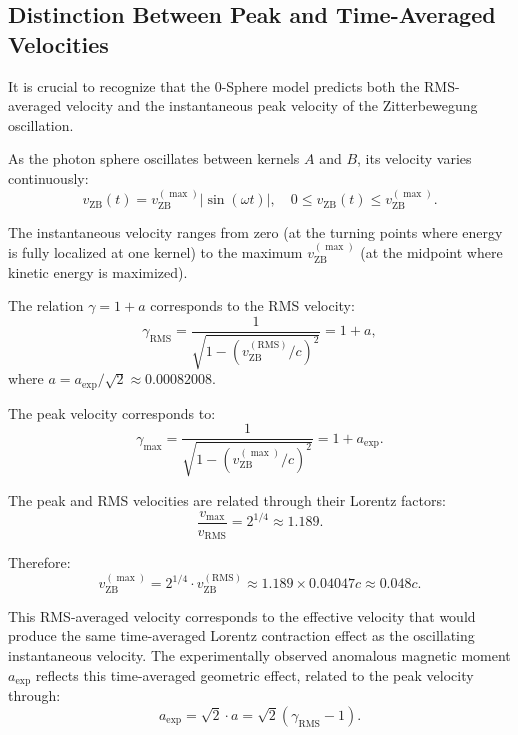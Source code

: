 \documentclass[12pt,letterpaper]{article}
\begin{document}
\subsection{Distinction Between Peak and Time-Averaged Velocities}

It is crucial to recognize that the 0-Sphere model predicts both the RMS-averaged velocity and the instantaneous peak velocity of the Zitterbewegung oscillation.

As the photon sphere oscillates between kernels $A$ and $B$, its velocity varies continuously:
\begin{equation}
v_{\mathrm{ZB}}(t) = v_{\mathrm{ZB}}^{(\max)} |\sin(\omega t)|, 
\quad 0 \le v_{\mathrm{ZB}}(t) \le v_{\mathrm{ZB}}^{(\max)}.
\end{equation}

The instantaneous velocity ranges from zero (at the turning points where energy is fully localized at one kernel) to the maximum $v_{\mathrm{ZB}}^{(\max)}$ (at the midpoint where kinetic energy is maximized).

The relation $\gamma = 1 + a$ corresponds to the RMS velocity:
\begin{equation}
\gamma_{\mathrm{RMS}} = \frac{1}{\sqrt{1 - (v_{\mathrm{ZB}}^{(\mathrm{RMS})}/c)^2}} = 1 + a,
\end{equation}
where $a = a_{\mathrm{exp}}/\sqrt{2} \approx 0.00082008$.

The peak velocity corresponds to:
\begin{equation}
\gamma_{\max} = \frac{1}{\sqrt{1 - (v_{\mathrm{ZB}}^{(\max)}/c)^2}} = 1 + a_{\mathrm{exp}}.
\end{equation}

The peak and RMS velocities are related through their Lorentz factors:
\begin{equation}
\frac{v_{\max}}{v_{\mathrm{RMS}}} = 2^{1/4} \approx 1.189.
\end{equation}

Therefore:
\begin{equation}
v_{\mathrm{ZB}}^{(\max)} = 2^{1/4} \cdot v_{\mathrm{ZB}}^{(\mathrm{RMS})} \approx 1.189 \times 0.04047c \approx 0.048c.
\end{equation}

This RMS-averaged velocity corresponds to the effective velocity that would produce the same time-averaged Lorentz contraction effect as the oscillating instantaneous velocity. The experimentally observed anomalous magnetic moment $a_{\mathrm{exp}}$ reflects this time-averaged geometric effect, related to the peak velocity through:
\begin{equation}
a_{\mathrm{exp}} = \sqrt{2} \cdot a = \sqrt{2}(\gamma_{\mathrm{RMS}} - 1).
\end{equation}
\end{document}
